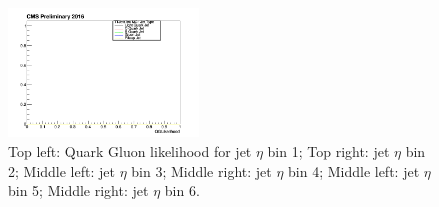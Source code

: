 \begin{figure}[htbp]
\begin{center}
  \includegraphics[width=0.45\textwidth]{sections/mc4/TopTagger/figures/_b_qglikelihoodjetetabin5_.png}
 \end{center}
 \caption{Top left: Quark Gluon likelihood for jet $\eta$ bin 1; Top right: jet $\eta$ bin 2; Middle left: jet $\eta$ bin 3; Middle right: jet $\eta$ bin 4; Middle left: jet $\eta$ bin 5; Middle right: jet $\eta$ bin 6.}
 \label{fig:c4ttqgljeteta}
\end{figure}

